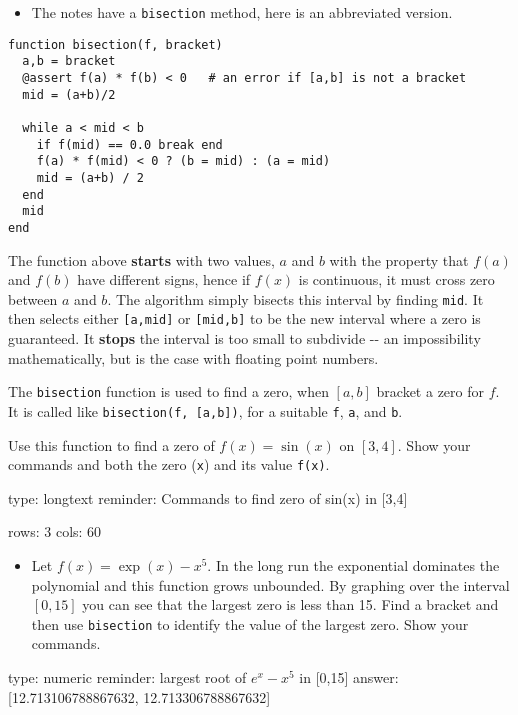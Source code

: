 \documentclass[12pt]{article}
\begin{document}
\begin{itemize}
\itemsep1pt\parskip0pt
\item
  The notes have a \texttt{bisection} method, here is an abbreviated
  version.
\end{itemize}



\begin{verbatim}
function bisection(f, bracket)
  a,b = bracket  
  @assert f(a) * f(b) < 0   # an error if [a,b] is not a bracket
  mid = (a+b)/2

  while a < mid < b
    if f(mid) == 0.0 break end
    f(a) * f(mid) < 0 ? (b = mid) : (a = mid)  
    mid = (a+b) / 2
  end
  mid
end
\end{verbatim}
The function above \textbf{starts} with two values, $a$ and $b$ with the
property that $f(a)$ and $f(b)$ have different signs, hence if $f(x)$ is
continuous, it must cross zero between $a$ and $b$. The algorithm simply
bisects this interval by finding \texttt{mid}. It then selects either
\texttt{{[}a,mid{]}} or \texttt{{[}mid,b{]}} to be the new interval
where a zero is guaranteed. It \textbf{stops} the interval is too small
to subdivide -{}- an impossibility mathematically, but is the case with
floating point numbers.

The \texttt{bisection} function is used to find a zero, when $[a,b]$
bracket a zero for $f$. It is called like
\texttt{bisection(f, {[}a,b{]})}, for a suitable \texttt{f}, \texttt{a},
and \texttt{b}.

Use this function to find a zero of $f(x) = \sin(x)$ on $[3,4]$. Show
your commands and both the zero (\texttt{x}) and its value
\texttt{f(x)}.

\begin{answer}
type: longtext
reminder: Commands to find zero of sin(x) in [3,4]

rows: 3
cols: 60
\end{answer}

\begin{itemize}
\itemsep1pt\parskip0pt
\item
  Let $f(x) = \exp(x) - x^5$. In the long run the exponential dominates
  the polynomial and this function grows unbounded. By graphing over the
  interval $[0,15]$ you can see that the largest zero is less than 15.
  Find a bracket and then use \texttt{bisection} to identify the value
  of the largest zero. Show your commands.
\end{itemize}

\begin{answer}
    type: numeric
    reminder: largest root of \( e^x - x^5 \) in [0,15]
    answer: [12.713106788867632, 12.713306788867632]

\end{answer}
\end{document}
